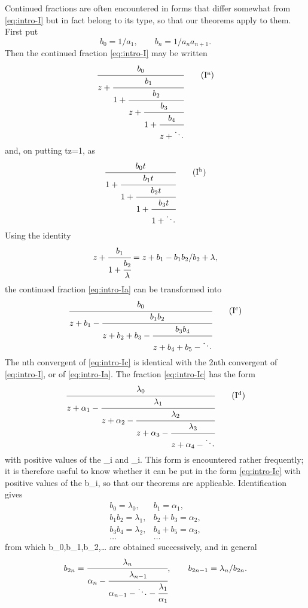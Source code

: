 \documentclass[
  paper=b5,
  fontsize=13pt,
  twoside,
  headings=normal,
  bookmarkpackage=false
]{scrartcl}
\theoremstyle{stieltjesplain}
\theoremstyle{stieltjesdefinition}
\def\({}\def\){}%
\def\frac#1#2{#1/#2}%
\begin{document}
Continued fractions are often encountered in forms that differ somewhat
from \eqref{eq:intro-I} but in fact belong to its type, so that our
theorems apply to them. First put
\[
 b_0=\frac{1}{a_1},\qquad
 b_n=\frac{1}{a_na_{n+1}}.
\]
Then the continued fraction \eqref{eq:intro-I} may be written
\begin{equation}
 \cfrac{b_0}{z+
  \cfrac{b_1}{1+
   \cfrac{b_2}{z+
    \cfrac{b_3}{1+
     \cfrac{b_4}{z+\ddots}}}}}
 \tag{I\textsuperscript{a}}\label{eq:intro-Ia}
\end{equation}
and, on putting \(tz=1\), as
\begin{equation}
 \cfrac{b_0t}{1+
  \cfrac{b_1t}{1+
   \cfrac{b_2t}{1+
    \cfrac{b_3t}{1+\ddots}}}}
 \tag{I\textsuperscript{b}}\label{eq:intro-Ib}
\end{equation}
Using the identity
\[
 z+\cfrac{b_1}{1+\cfrac{b_2}{\lambda}}
   =z+b_1-\frac{b_1b_2}{b_2+\lambda},
\]
the continued fraction \eqref{eq:intro-Ia} can be transformed into
\begin{equation}
 \cfrac{b_0}{z+b_1-
  \cfrac{b_1b_2}{z+b_2+b_3-
   \cfrac{b_3b_4}{z+b_4+b_5-\ddots}}}
 \tag{I\textsuperscript{c}}\label{eq:intro-Ic}
\end{equation}
The \(n\)th convergent of \eqref{eq:intro-Ic} is identical with the
\(2n\)th convergent of \eqref{eq:intro-I}, or of
\eqref{eq:intro-Ia}. The fraction \eqref{eq:intro-Ic} has the form
\begin{equation}
 \cfrac{\lambda_0}{z+\alpha_1-
  \cfrac{\lambda_1}{z+\alpha_2-
   \cfrac{\lambda_2}{z+\alpha_3-
    \cfrac{\lambda_3}{z+\alpha_4-\ddots}}}}
 \tag{I\textsuperscript{d}}\label{eq:intro-Id}
\end{equation}
with positive values of the \(\lambda_i\) and \(\alpha_i\). This form is
encountered rather frequently; it is therefore useful to know whether it
can be put in the form \eqref{eq:intro-Ic} with positive values of the
\(b_i\), so that our theorems are applicable. Identification gives
\[
\begin{array}{lll}
 b_0=\lambda_0,& b_1=\alpha_1,\\
 b_1b_2=\lambda_1,& b_2+b_3=\alpha_2,\\
 b_3b_4=\lambda_2,& b_4+b_5=\alpha_3,\\
 \ldots&\ldots
\end{array}
\]
from which \(b_0,b_1,b_2,\ldots\) are obtained successively, and in
general
\[
 b_{2n}=\cfrac{\lambda_n}{\alpha_n-
  \cfrac{\lambda_{n-1}}{\alpha_{n-1}-\ddots-
   \cfrac{\lambda_1}{\alpha_1}}},
 \qquad
 b_{2n-1}=\frac{\lambda_n}{b_{2n}}.
\]
\end{document}
